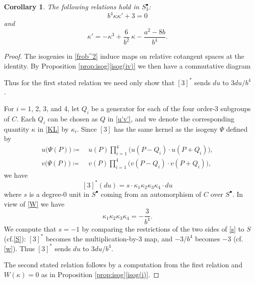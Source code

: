 \documentclass{gtpart}
\newtheorem{cor}[thm]{Corollary}
\theoremstyle{definition}
\theoremstyle{remark}
\newcommand{\cf}{cf.\thinspace}
\newcommand{\K}{\kappa}
\newcommand{\s}{S^\bullet}
\newcommand{\isog}[1]{Proposition \ref{prop:isog}\thinspace \eqref{isog(#1)}}
\begin{document}
\begin{cor}
\label{cor:K'}
 The following relations hold in $\s_3$: 
 \[
  b^4 \K \K' + 3 = 0 
 \]
 and 
 \[
  \K' = -\K^3 + \frac{6}{b^2} ~ \K - \frac{a^2 - 8 b}{b^4}.  
 \]
\end{cor}
\begin{proof}
 The isogenies in \eqref{frob^2} induce maps on relative cotangent spaces at the identity.  
 By \isog{iv} we then have a commutative diagram 
 \begin{center}
 \end{center}
 Thus for the first stated relation we need only show that $[3]^*$ sends $du$ to $3 du / b^4$.  

 For $i = 1$, 2, 3, and 4, let $Q_i$ be a generator for each of the four order-3 subgroups of $C$.  
 Each $Q_i$ can be chosen as $Q$ in \eqref{u'v'}, 
 and we denote the corresponding quantity $\K$ in \eqref{KL} by $\K_i$.  
 Since $[3]$ has the same kernel as the isogeny $\Psi$ defined by 
 \begin{equation*}
 \begin{split}
  u\big( \Psi(P) \big) \coloneqq & ~ u(P) \prod_{i=1}^4 \big( u(P-Q_i) \cdot u(P+Q_i) \big), \\
  v\big( \Psi(P) \big) \coloneqq & ~ v(P) \prod_{i=1}^4 \big( v(P-Q_i) \cdot v(P+Q_i) \big), 
 \end{split}
 \end{equation*}
 we have 
 \begin{equation}
 \label{s}
  [3]^* (du) = s \cdot \K_1 \K_2 \K_3 \K_4 \cdot du 
 \end{equation}
 where $s$ is a degree-0 unit in $\s$ coming from an automorphism of $C$ over $\s$.  
 In view of \eqref{W} we have 
 \[
  \K_1 \K_2 \K_3 \K_4 = -\frac{3}{b^4}.  
 \]
 We compute that $s = -1$ by comparing the restrictions of the two sides of \eqref{s} to $S$ (\cf \eqref{S}): 
 $[3]^*$ becomes the multiplication-by-3 map, and $-3 / b^4$ becomes $-3$ (\cf \eqref{w}).  
 Thus $[3]^*$ sends $du$ to $3 du / b^4$.  

 The second stated relation follows by a computation from the first relation and $W(\K) = 0$ as in \isog{i}.  
\end{proof}
\end{document}
